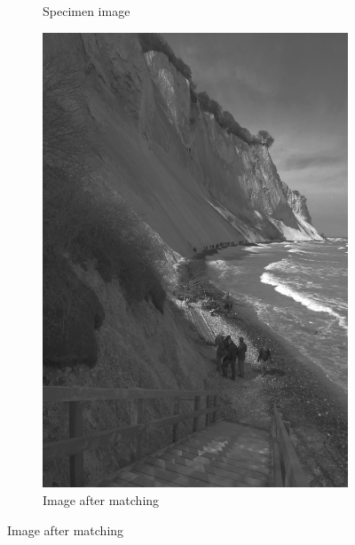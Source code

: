\documentclass[a4paper]{article}
\begin{document}
\begin{figure}[ht]
\begin{subfigure}[b]{0.3\textwidth}
                \caption{Specimen image}
                \label{fig:abe2}
        \end{subfigure}
        \begin{subfigure}[b]{0.3\textwidth}
                \centering
                \includegraphics[width=\textwidth]{q4b-result.png}
                \caption{Image after matching}
                \label{fig:ae2}
        \end{subfigure}
        

\end{figure}
\end{document}
